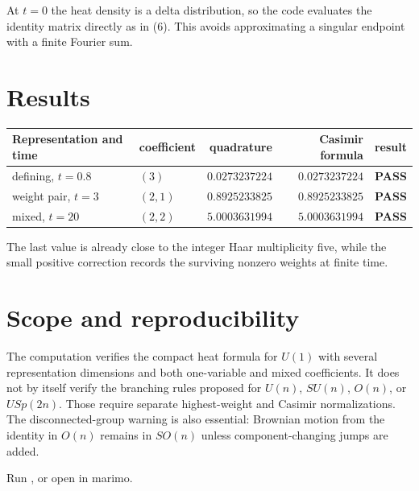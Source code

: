 \documentclass[10pt]{article}
\newcommand{\PASS}{\textcolor{passgreen}{\textbf{PASS}}}
\begin{document}
At $t=0$ the heat density is a delta distribution, so the code evaluates the
identity matrix directly as in (6).  This avoids approximating a singular
endpoint with a finite Fourier sum.

\section{Results}
\begin{center}
\begin{tabularx}{\linewidth}{@{}lXrrc@{}}
\toprule
Representation and time & coefficient & quadrature & Casimir formula & result\\
\midrule
defining, $t=0.8$ & $(3)$ & $0.0273237224$ & $0.0273237224$ & \PASS\\
weight pair, $t=3$ & $(2,1)$ & $0.8925233825$ & $0.8925233825$ & \PASS\\
mixed, $t=20$ & $(2,2)$ & $5.0003631994$ & $5.0003631994$ & \PASS\\
\bottomrule
\end{tabularx}
\end{center}
The last value is already close to the integer Haar multiplicity five, while
the small positive correction records the surviving nonzero weights at finite
time.

\section{Scope and reproducibility}
The computation verifies the compact heat formula for $U(1)$ with several
representation dimensions and both one-variable and mixed coefficients.  It
does not by itself verify the branching rules proposed for $U(n)$, $SU(n)$,
$O(n)$, or $USp(2n)$.  Those require separate highest-weight and Casimir
normalizations.  The disconnected-group warning is also essential: Brownian
motion from the identity in $O(n)$ remains in $SO(n)$ unless component-changing
jumps are added.

Run , or open
 in marimo.
\end{document}
